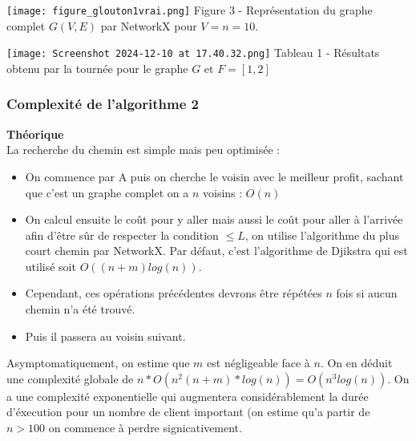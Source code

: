 \documentclass[a4paper, 12pt, DIV=12]{scrartcl}
\begin{document}
\begin{center}
\texttt{[image: figure\_glouton1vrai.png]}
Figure 3 - Représentation du graphe complet $G(V,E)$ par NetworkX pour $V = n =10$. 
\end{center}

\begin{center}
\texttt{[image: Screenshot 2024-12-10 at 17.40.32.png]}
Tableau 1 - Résultats obtenu par la tournée pour le graphe $G$ et $F = [1,2]$
\end{center}

\newpage
\subsubsection{Complexité de l'algorithme 2}
\textbf{Théorique} \\[5pt]


La recherche du chemin est simple mais peu optimisée : 
\begin{itemize}
    \item On commence par A puis on cherche le voisin avec le meilleur profit, sachant que c'est un graphe complet on a $n$ voisins : $O(n)$
    \item On calcul ensuite le coût pour y aller mais aussi le coût pour aller à l'arrivée afin d'être sûr de respecter la condition $\leq L$, on utilise l'algorithme du plus court chemin par NetworkX. Par défaut, c'est l'algorithme de Djikstra qui est utilisé soit $O((n+m)    log(n))$. 
    \item Cependant, ces opérations précédentes devrons être répétées $n$ fois si aucun chemin n'a été trouvé. 
    \item Puis il passera au voisin suivant.
\end{itemize}
Asymptomatiquement, on estime que $m$ est négligeable face à $n$. On en déduit une complexité globale de $n*O(n^2(n+m)*log(n)) = O(n^3log(n))$.
On a une complexité exponentielle qui augmentera considérablement la durée d'éxecution pour un nombre de client important (on estime qu'a partir de $n >100$ on commence à perdre signicativement.\\[10pt]
\end{document}
